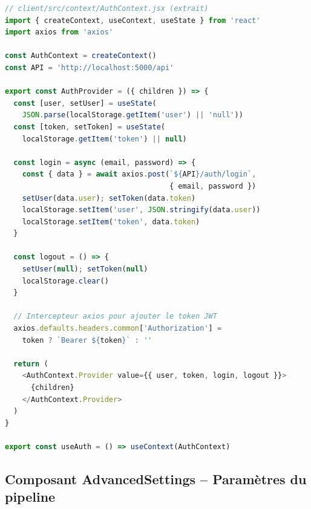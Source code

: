\begin{lstlisting}[language=JavaScript, caption={AuthContext React -- gestion de l'état d'authentification}, label={lst:authcontext}]
// client/src/context/AuthContext.jsx (extrait)
import { createContext, useContext, useState } from 'react'
import axios from 'axios'

const AuthContext = createContext()
const API = 'http://localhost:5000/api'

export const AuthProvider = ({ children }) => {
  const [user, setUser] = useState(
    JSON.parse(localStorage.getItem('user') || 'null'))
  const [token, setToken] = useState(
    localStorage.getItem('token') || null)

  const login = async (email, password) => {
    const { data } = await axios.post(`${API}/auth/login`,
                                      { email, password })
    setUser(data.user); setToken(data.token)
    localStorage.setItem('user', JSON.stringify(data.user))
    localStorage.setItem('token', data.token)
  }

  const logout = () => {
    setUser(null); setToken(null)
    localStorage.clear()
  }

  // Intercepteur axios pour ajouter le token JWT
  axios.defaults.headers.common['Authorization'] =
    token ? `Bearer ${token}` : ''

  return (
    <AuthContext.Provider value={{ user, token, login, logout }}>
      {children}
    </AuthContext.Provider>
  )
}

export const useAuth = () => useContext(AuthContext)
\end{lstlisting}

\subsection{Composant AdvancedSettings -- Paramètres du pipeline}

